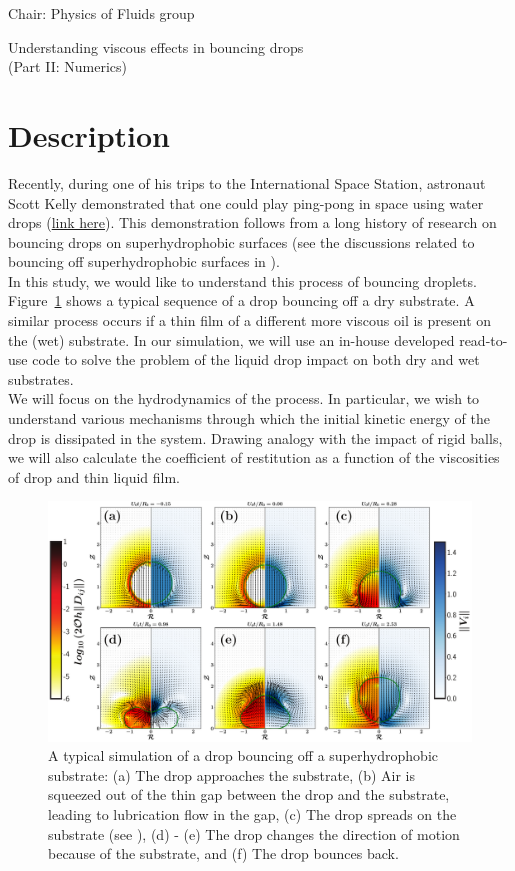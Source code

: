 \documentclass[a4paper,10pt]{article}
\begin{document}
\noindent Chair: Physics of Fluids group
\begin{center}
 \begin{LARGE}
  Understanding viscous effects in bouncing drops\\ (Part II: Numerics)
 \end{LARGE}
\end{center}
\section*{Description}
Recently, during one of his trips to the International Space Station, astronaut Scott Kelly demonstrated that one could play ping-pong in space using water drops (\href{https://www.youtube.com/watch?v=TLbhrMCM4_0}{link here}). This demonstration follows from a long history of research on bouncing drops on superhydrophobic surfaces (see the discussions related to bouncing off superhydrophobic surfaces in \citet{josserand2016drop}).\\
In this study, we would like to understand this process of bouncing droplets. Figure~\ref{Figure::Typical} shows a typical sequence of a drop bouncing off a dry substrate. A similar process occurs if a thin film of a different more viscous oil is present on the (wet) substrate. In our simulation, we will use an in-house developed read-to-use code to solve the problem of the liquid drop impact on both dry and wet substrates.\\
We will focus on the hydrodynamics of the process. In particular, we wish to understand various mechanisms through which the initial kinetic energy of the drop is dissipated in the system. Drawing analogy with the impact of rigid balls, we will also calculate the coefficient of restitution as a function of the viscosities of drop and thin liquid film.
\begin{figure}[H]
\begin{center}
 \includegraphics[width=\textwidth]{Figure1.pdf}
 \caption{A typical simulation of a drop bouncing off a superhydrophobic substrate: (a) The drop approaches the substrate, (b) Air is squeezed out of the thin gap between the drop and the substrate, leading to lubrication flow in the gap, (c) The drop spreads on the substrate (see \citet{wildeman2016spreading}), (d) - (e) The drop changes the direction of motion because of the substrate, and (f) The drop bounces back.}
 \label{Figure::Typical}
\end{center}
\end{figure}
\end{document}
